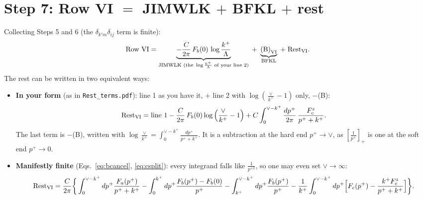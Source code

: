 \documentclass[10pt]{article}
\numberwithin{equation}{section}
\begin{document}
\section{Step 7: Row VI \texorpdfstring{$=$}{=} JIMWLK \texorpdfstring{$+$}{+} BFKL \texorpdfstring{$+$}{+} rest}
Collecting Steps 5 and 6 (the $\delta_{k'm}\delta_{ij}$ term is finite):
\begin{equation}
\text{Row VI}=\underbrace{-\frac{C}{2\pi}\,F_b(0)\,\log\frac{k^+}{\Lambda}}_{\text{JIMWLK (the }\log\frac{k^+}{\Lambda}\text{ of your line 2)}}\;+\;\underbrace{\text{(B)}_{\rm VI}}_{\text{BFKL}}\;+\;\text{Rest}_{\rm VI}.
\end{equation}
The rest can be written in two equivalent ways:
\begin{itemize}
\item \textbf{In your form} (as in \texttt{Rest\_terms.pdf}): line 1 as you have it, $+$ line 2 with $\log(\frac{\vee}{k^+}-1)$ only, $-$(B):
\begin{equation}
\text{Rest}_{\rm VI}=\text{line 1}-\frac{C}{2\pi}\,F_b(0)\log\Big(\frac{\vee}{k^+}-1\Big)+C\int_0^{\vee-k^+}\frac{dp^+}{2\pi}\,\frac{F_c^z}{p^++k^+}.
\label{eq:restyour}
\end{equation}
The last term is $-$(B), written with $\log\frac{\vee}{k^+}=\int_0^{\vee-k^+}\frac{dp^+}{p^++k^+}$. It is a subtraction at the hard end $p^+\to\vee$, as $[\frac{1}{p^+}]_+$ is one at the soft end $p^+\to0$.
\item \textbf{Manifestly finite} (Eqs.~\eqref{eq:bcancel}, \eqref{eq:csplit}): every integrand falls like $\frac{1}{p^{+2}}$, so one may even set $\vee\to\infty$:
\begin{equation}
\text{Rest}_{\rm VI}=\frac{C}{2\pi}\bigg\{\int_0^{\vee-k^+}dp^+\frac{F_a(p^+)}{p^++k^+}-\int_0^{k^+}dp^+\frac{F_b(p^+)-F_b(0)}{p^+}-\int_{k^+}^{\vee-k^+}dp^+\frac{F_b(p^+)}{p^+}-\frac{1}{k^+}\int_0^{\vee-k^+}dp^+\Big[F_c(p^+)-\frac{k^+F_c^z}{p^++k^+}\Big]\bigg\}.
\end{equation}
\end{itemize}
\end{document}
